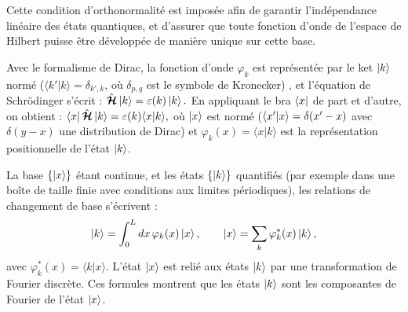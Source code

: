 \medskip

Cette condition d’orthonormalité est imposée afin de garantir l’indépendance linéaire des états quantiques, et d'assurer que toute fonction d’onde de l’espace de Hilbert puisse être développée de manière unique sur cette base. 

%

\medskip

Avec le formalisme de Dirac, la fonction d’onde $\varphi_k$ est représentée par le ket $\ket{k}$ normé (\ie $\langle k' \vert k \rangle = \delta_{k', k}$, où $\delta_{p,q}$ est le symbole de Kronecker)
, et l’équation de Schrödinger s’écrit :
\(
\hat{\bm{\mathcal{H}}} \ket{k} = \varepsilon(k) \ket{k}.
\)
En appliquant le bra $\bra{x}$ de part et d’autre, on obtient :
\(
\bra{x} \hat{\bm{\mathcal{H}}} \ket{k} = \varepsilon(k) \langle x \vert k \rangle,
\)
où $\ket{x}$ est normé (\ie $\braket{x'\vert x} = \delta ( x' - x ) $ avec $\delta ( y - x )$ une distribution de Dirac) et $\varphi_k(x) = \langle x \vert k \rangle$ est la représentation positionnelle de l’état $\ket{k}$.


\begin{mdframed}[
	linewidth=0.5pt, 
	backgroundcolor=gray!5, 
	roundcorner=50pt,	
	innerleftmargin=5pt,
    innerrightmargin=5pt,
    innertopmargin=1pt,
    innerbottommargin=2pt,
    leftmargin=2pt,
    rightmargin=2pt
	]
La base $\{\ket{x}\}$ étant continue, et les états $\{\ket{k}\}$ quantifiés (par exemple dans une boîte de taille finie avec conditions aux limites périodiques), les relations de changement de base s’écrivent :
\begin{eqnarray}
	\ket{k} = \int_0^L dx \, \varphi_k(x) \ket{x}, \qquad   
	\ket{x} = \sum_k \varphi_k^\ast(x) \ket{k},
\end{eqnarray}
avec $\varphi_k^\ast(x) = \langle k \vert x \rangle$. L’état $\ket{x}$ est relié aux états $\ket{k}$ par une transformation de Fourier discrète. Ces formules montrent que les états $\ket{k}$ sont les composantes de Fourier de l’état $\ket{x}$.
\end{mdframed}


